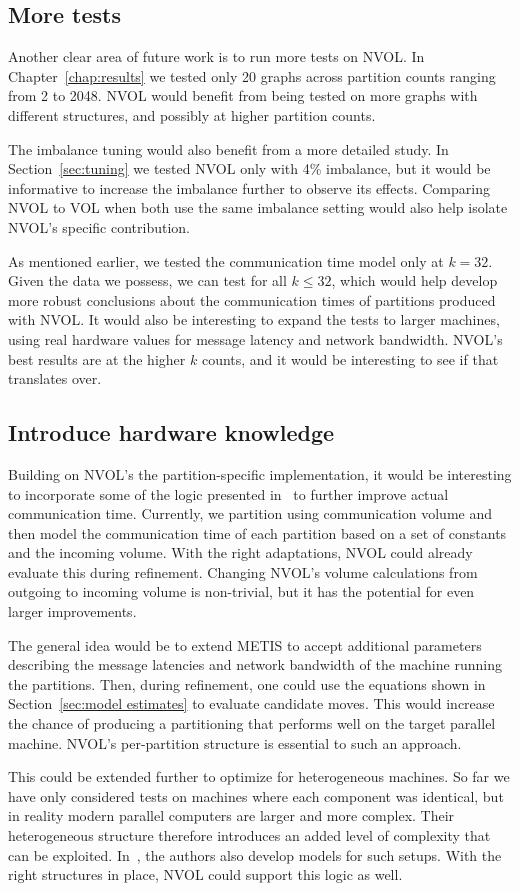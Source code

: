 \subsection{More tests}
Another clear area of future work is to run more tests on NVOL. In Chapter~\ref{chap:results} we tested only 20 graphs across partition counts ranging from 2 to 2048. NVOL would benefit from being tested on more graphs with different structures, and possibly at higher partition counts.

The imbalance tuning would also benefit from a more detailed study. In Section~\ref{sec:tuning} we tested NVOL only with 4\% imbalance, but it would be informative to increase the imbalance further to observe its effects. Comparing NVOL to VOL when both use the same imbalance setting would also help isolate NVOL's specific contribution.

As mentioned earlier, we tested the communication time model only at $k=32$. Given the data we possess, we can test for all $k \leq 32$, which would help develop more robust conclusions about the communication times of partitions produced with NVOL. It would also be interesting to expand the tests to larger machines, using real hardware values for message latency and network bandwidth. NVOL's best results are at the higher $k$ counts, and it would be interesting to see if that translates over. 

\subsection{Introduce hardware knowledge}
Building on NVOL's the partition-specific implementation, it would be interesting to incorporate some of the logic presented in~\cite{Xing_of_Heterogeneous} to further improve actual communication time. Currently, we partition using communication volume and then model the communication time of each partition based on a set of constants and the incoming volume. With the right adaptations, NVOL could already evaluate this during refinement. Changing NVOL's volume calculations from outgoing to incoming volume is non-trivial, but it has the potential for even larger improvements.

The general idea would be to extend METIS to accept additional parameters describing the message latencies and network bandwidth of the machine running the partitions. Then, during refinement, one could use the equations shown in Section~\ref{sec:model estimates} to evaluate candidate moves. This would increase the chance of producing a partitioning that performs well on the target parallel machine. NVOL's per-partition structure is essential to such an approach.

This could be extended further to optimize for heterogeneous machines. So far we have only considered tests on machines where each component was identical, but in reality modern parallel computers are larger and more complex. Their heterogeneous structure therefore introduces an added level of complexity that can be exploited. In~\cite{Xing_of_Heterogeneous}, the authors also develop models for such setups. With the right structures in place, NVOL could support this logic as well.